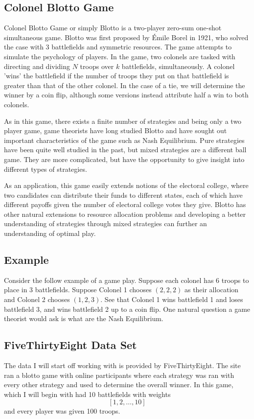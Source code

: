 \documentclass[12pt,letter]{article}
\begin{document}
\subsection{Colonel Blotto Game}
Colonel Blotto Game or simply Blotto is a two-player zero-sum one-shot simultaneous game. Blotto was first proposed by \'{E}mile Borel in 1921, who solved the case with 3 battlefields and symmetric resources. The game attempts to simulate the psychology of players. In the game, two colonels are tasked with directing and dividing $N$ troops over $k$ battlefields, simultaneously. A colonel 'wins' the battlefield if the number of troops they put on that battlefield is greater than that of the other colonel. In the case of a tie, we will determine the winner by a coin flip, although some versions instead attribute half a win to both colonels. 

As in this game, there exists a finite number of strategies and being only a two player game, game theorists have long studied Blotto and have sought out important characteristics of the game such as Nash Equilibrium. Pure strategies have been quite well studied in the past, but mixed strategies are a different ball game. They are more complicated, but have the opportunity to give insight into different types of strategies.

As an application, this game easily extends notions of the electoral college, where two candidates can distribute their funds to different states, each of which have different payoffs given the number of electoral college votes they give. Blotto has other natural extensions to resource allocation problems and developing a better understanding of strategies through mixed strategies can further an understanding of optimal play.

\subsection{Example}
Consider the follow example of a game play. Suppose each colonel has 6 troops to place in 3 battlefields. Suppose Colonel 1 chooses $(2, 2, 2)$ as their allocation and Colonel 2 chooses $(1, 2, 3)$. See that Colonel 1 wins battlefield 1 and loses battlefield 3, and wins battlefield 2 up to a coin flip. One natural question a game theorist would ask is what are the Nash Equilibrium.

\subsection{FiveThirtyEight Data Set}
The data I will start off working with is provided by FiveThirtyEight. The site ran a blotto game with online participants where each strategy was ran with every other strategy and used to determine the overall winner. In this game, which I will begin with had 10 battlefields with weights 
\[[1, 2, \dots, 10]\]
and every player was given 100 troops.
\end{document}
